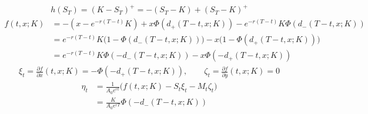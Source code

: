 \documentclass[12pt]{article}
\newenvironment{solution}[2][Solution]{\begin{trivlist}
\item[\hskip \labelsep {\bfseries #1}\hskip \labelsep {\bfseries #2.}]}{\end{trivlist}}
\newenvironment{question}[2][Question]{\begin{trivlist}
\item[\hskip \labelsep {\bfseries #1}\hskip \labelsep {\bfseries #2.}]}{\end{trivlist}}
\begin{document}
\ \\
\begin{question}{10}
\end{question}
\begin{solution}[Solution] \\ 
\begin{align*}
    h(S_T) = (K-S_T)^+ = -(S_T -K)+(S_T -K)^+
\end{align*}
\begin{align*}
    f(t,x;K) &= -(x-e^{-r(T-t)}K)+ x\Phi(d_+(T-t,x;K))-e^{-r(T-t)}K\Phi(d_-(T-t,x;K))\\
    &= e^{-r(T-t)}K \big(1-\Phi(d_-(T-t,x;K))\big) - x\big(1-\Phi(d_+(T-t,x;K))\big)\\
    &= e^{-r(T-t)}K \Phi(-d_-(T-t,x;K)) - x\Phi(-d_+(T-t,x;K))
\end{align*}
\begin{align*}
    \xi_t = \frac{\partial f}{\partial x}(t,x;K)=-\Phi(-d_+(T-t,x;K)), \qquad \zeta_t =\frac{\partial f}{\partial y}(t,x;K)=0
\end{align*}
\begin{align*}
    \eta_t &= \frac{1}{A_0 e^{rt}} \big(f(t,x;K) - S_t\xi_t- M_t \zeta_t\big)\\
    &= \frac{K}{A_0e^{rT}} \Phi(-d_-(T-t,x;K))
\end{align*}
\end{solution}


 
\end{document}
